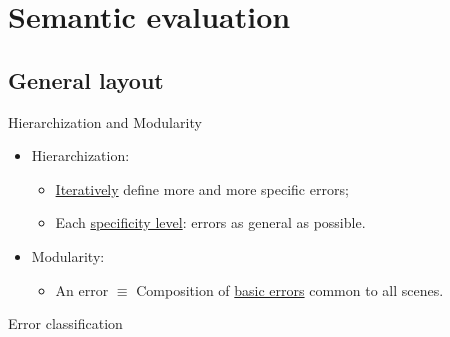 \documentclass[12pt]{beamer}
\begin{document}
    \section{Semantic evaluation}
        \subsection{General layout}
            \begin{frame}{Hierarchization and Modularity}
                \begin{itemize}[label=\(\blacktriangleright\), font=\color{IGNGreen}, itemsep=2em]
                    \item<1-> Hierarchization:
                        \begin{itemize}[label=\(\blacktriangleright\), font=\color{IGNGreen}]
                            \item<2-> \underline{Iteratively} define more and more specific errors;
                            \item<3-> Each \underline{specificity level}: errors as general as possible.
                        \end{itemize}
                    \item<4-> Modularity:
                        \begin{itemize}[label=\(\blacktriangleright\), font=\color{IGNGreen}]
                            \item<5-> An error \(\equiv\) Composition of \underline{basic errors} common to all scenes.
                        \end{itemize}
                \end{itemize}
            \end{frame}
        
            \begin{frame}{Error classification}
                
            \end{frame}
\end{document}
